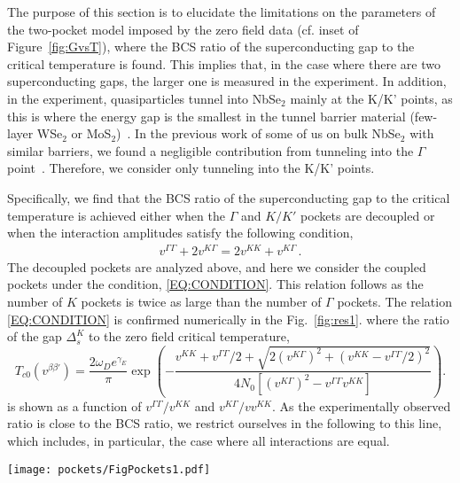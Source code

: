 \documentclass[showpacs,superscriptaddress,onecolumn,prb]{revtex4}
\begin{document}
The purpose of this section is to elucidate the limitations on the parameters of the two-pocket model imposed by the zero field data (cf. inset of Figure~\ref{fig:GvsT}), where the BCS ratio of the superconducting gap to the critical temperature is found. This implies that, in the case where there are two superconducting gaps, the larger one is measured in the experiment. In addition, in the experiment, quasiparticles tunnel into NbSe$_2$ mainly at the K/K' points, as this is where the energy gap is the smallest in the tunnel barrier material (few-layer WSe$_2$ or MoS$_2$)~\cite{zhu,wang2012}. In the previous work of some of us on bulk NbSe$_2$ with similar barriers, we found a negligible contribution from tunneling into the $\Gamma$ point~\cite{Dvir2017}. Therefore, we consider only tunneling into the K/K' points. 

Specifically, we find that the BCS ratio of the superconducting gap to the critical temperature is achieved either when the $\Gamma$ and $K/K'$ pockets are decoupled or when the interaction amplitudes satisfy the following condition, 
\begin{align}\label{EQ:CONDITION}
    v^{\Gamma\Gamma}+ 2v^{K\Gamma}=2v^{KK} + v^{K\Gamma}\, .
\end{align}
The decoupled pockets are analyzed above, and here we consider the coupled pockets under the condition, \eqref{EQ:CONDITION}.
This relation follows as the number of $K$ pockets is twice as large than the number of $\Gamma$ pockets.
The relation \eqref{EQ:CONDITION} is confirmed numerically in the Fig.~\ref{fig:res1}.
where the ratio of the gap $\Delta_s^K$ to the zero field critical temperature,
\begin{equation}
\label{eq:Tc0_v}
T_{c0}\left(v^{\beta\beta'}\right)=\frac{2\omega_{D}e^{\gamma_{E}}}{\pi}\exp\left(-\frac{v^{KK}+v^{\Gamma\Gamma}/2+\sqrt{2\left(v^{K\Gamma}\right)^{2}+\left(v^{KK}-v^{\Gamma\Gamma}/2\right)^{2}}}{4N_{0}\left[\left(v^{K\Gamma}\right)^{2}-v^{\Gamma\Gamma}v^{KK}\right]}\right).
\end{equation}
is shown as a function of $v^{\Gamma\Gamma}/v^{KK}$ and $v^{K\Gamma}/vv^{KK}$. As the experimentally observed ratio is close to the BCS ratio, we restrict ourselves in the following to this line, which includes, in particular, the case where all interactions are equal.





\begin{figure*}%
\centering
\texttt{[image: pockets/FigPockets1.pdf]}
\caption{\label{fig:res1}The OPs at $E_{Z}=0$ for different values of $v^{\Gamma\Gamma}/v^{KK}$
and $v^{K\Gamma}/v^{KK}$, as calculated by numerically
solving the two self-consistency equations. 
The plots show the larger OP, which is $\Delta_{s}^{K}$ in the region of panel $\mathbf{\left(a\right)}$ and $\Delta_{s}^{\Gamma}$ in the region of panel $\mathbf{\left(b\right)}$. We take $N_{0}v^{KK}=-0.5$, and $T/T_{c0}=0.5$ where $T_{c0}$ is given by Eq.~\eqref{eq:Tc0_v} and
the OPs is in units of $T_{c0}$.
}
\end{figure*}
\end{document}
